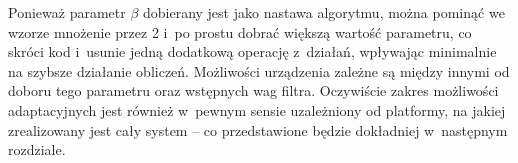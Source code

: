 Ponieważ parametr $\beta$ dobierany jest jako nastawa algorytmu, można pominąć we wzorze mnożenie przez 2 i~po prostu dobrać większą wartość parametru, co skróci kod i~usunie jedną dodatkową operację z~działań, wpływając minimalnie na szybsze działanie obliczeń. Możliwości urządzenia zależne są między innymi od doboru tego parametru oraz wstępnych wag filtra. Oczywiście zakres możliwości adaptacyjnych jest również w~pewnym sensie uzależniony od platformy, na jakiej zrealizowany jest cały system -- co przedstawione będzie dokładniej w~następnym rozdziale.